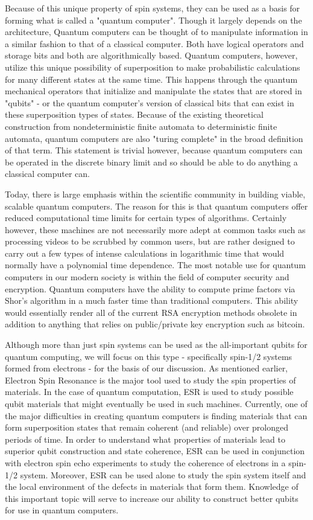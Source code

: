 \documentclass[oneside, astronomy, noacknowlegments]{BYUPhys}
\begin{document}
Because of this unique property of spin systems, they can be used as a basis for forming what is called a "quantum computer". Though it largely depends on the architecture, Quantum computers can be thought of to manipulate information in a similar fashion to that of a classical computer. Both have logical operators and storage bits and both are algorithmically based. Quantum computers, however, utilize this unique possibility of superposition to make probabilistic calculations for many different states at the same time. This happens through the quantum mechanical operators that initialize and manipulate the states that are stored in "qubits" - or the quantum computer's version of classical bits that can exist in these superposition types of states. Because of the existing theoretical construction from nondeterministic finite automata to deterministic finite automata, quantum computers are also "turing complete" in the broad definition of that term. This statement is trivial however, because quantum computers can be operated in the discrete binary limit and so should be able to do anything a classical computer can.

Today, there is large emphasis within the scientific community in building viable, scalable quantum computers. The reason for this is that quantum computers offer reduced computational time limits for certain types of algorithms. Certainly however, these machines are not necessarily more adept at common tasks such as processing videos to be scrubbed by common users, but are rather designed to carry out a few types of intense calculations in logarithmic time that would normally have a polynomial time dependence. The most notable use for quantum computers in our modern society is within the field of computer security and encryption. Quantum computers have the ability to compute prime factors via Shor's algorithm in a much faster time than traditional computers. This ability would essentially render all of the current RSA encryption methods obsolete in addition to anything that relies on public/private key encryption such as bitcoin.

Although more than just spin systems can be used as the all-important qubits for quantum computing, we will focus on this type - specifically spin-1/2 systems formed from electrons - for the basis of our discussion. As mentioned earlier, Electron Spin Resonance is the major tool used to study the spin properties of materials. In the case of quantum computation, ESR is used to study possible qubit materials that might eventually be used in such machines. Currently, one of the major difficulties in creating quantum computers is finding materials that can form superposition states that remain coherent (and reliable) over prolonged periods of time. In order to understand what properties of materials lead to superior qubit construction and state coherence, ESR can be used in conjunction with electron spin echo experiments to study the coherence of electrons in a spin-1/2 system. Moreover, ESR can be used alone to study the spin system itself and the local environment of the defects in materials that form them. Knowledge of this important topic will serve to increase our ability to construct better qubits for use in quantum computers.
\end{document}

